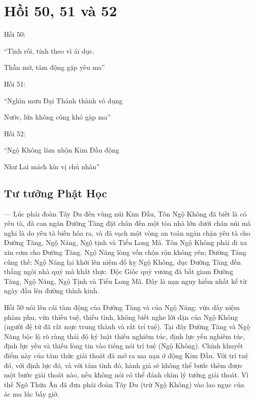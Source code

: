 \chapter{Hồi 50, 51 và 52} %
\label{cha:hoi_50_51}

Hồi 50:

\begin{itshape}
``Tình rối, tính theo vì ái dục.

Thần mờ, tâm động gặp yêu ma''
\end{itshape}

Hồi 51:

\begin{itshape}
``Nghìn mưu Đại Thánh thành vô dụng

Nước, lửa không công khó gặp ma''
\end{itshape}

Hồi 52:

\begin{itshape}
``Ngộ Không làm nhộn Kim Đầu động

Như Lai mách kín vị chủ nhân''
\end{itshape}

\section{Tư tưởng Phật Học} %
\label{sec:50_51_phat_hoc}

— Lúc phái đoàn Tây Du đến vùng núi Kim Đầu, Tôn Ngộ Không đã biết là có yêu tà, đã can ngăn Đường Tăng đặt chân đến một tòa nhà lớn dưới chân núi mà nghi là do yêu tà biến hóa ra, và đã vạch một vòng an toàn ngăn chặn yêu tà cho Đường Tăng, Ngộ Năng, Ngộ tịnh và Tiểu Long Mã. Tôn Ngộ Không phải đi xa xin cơm cho Đường Tăng. Ngộ Năng lòng vốn chộn rộn không yên; Đường Tăng cũng thế; Ngộ Năng lại khởi lên niệm đố kỵ Ngộ Không, dục Đường Tăng đến thẳng ngôi nhà quỷ mà khất thực. Độc Giốc quỷ vương đã bắt giam Đường Tăng, Ngộ Năng, Ngộ Tịnh và Tiểu Long Mã. Đây là nạn nguy hiểm nhất kể từ ngày đầu lên đường thỉnh kinh.

Hồi 50 nói lên cái tâm động của Đường Tăng và của Ngộ Năng: vừa dấy niệm phàm phu, vừa thiếu tuệ, thiếu tình, không biết nghe lời dặn của Ngộ Không (người đệ tử đã rất mực trung thành và rất trí tuệ). Tại đây Đường Tăng và Ngộ Năng bộc lộ rõ ràng thái độ kỷ luật thiếu nghiêm túc, định lực yếu nghiêm túc, định lực yếu và thiếu lòng tin vào tiếng nói trí tuệ (Ngộ Không). Chính khuyết điểm này của tâm thức giải thoát đã mở ra ma nạn ở động Kim Đầu. Với trí tuệ đó, với định lực đó, và với tâm tình đó, hành giả sẽ không thể bước thêm được một bước giải thoát nào, nếu không nói có thể đánh chìm lý tưởng giải thoát. Vì thế Ngô Thừa Ân đã đưa phái đoàn Tây Du (trừ Ngộ Không) vào lao ngục của ác ma lúc bấy giờ.

